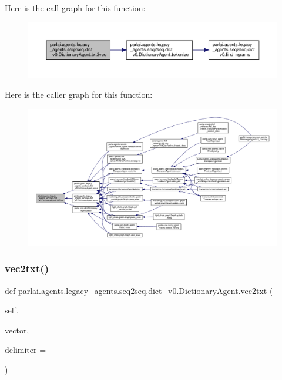 Here is the call graph for this function\+:
\nopagebreak
\begin{figure}[H]
\begin{center}
\leavevmode
\includegraphics[width=350pt]{classparlai_1_1agents_1_1legacy__agents_1_1seq2seq_1_1dict__v0_1_1DictionaryAgent_a5d89ed4dcebcd41853bd0614d30337e7_cgraph}
\end{center}
\end{figure}
Here is the caller graph for this function\+:
\nopagebreak
\begin{figure}[H]
\begin{center}
\leavevmode
\includegraphics[width=350pt]{classparlai_1_1agents_1_1legacy__agents_1_1seq2seq_1_1dict__v0_1_1DictionaryAgent_a5d89ed4dcebcd41853bd0614d30337e7_icgraph}
\end{center}
\end{figure}
\mbox{\label{classparlai_1_1agents_1_1legacy__agents_1_1seq2seq_1_1dict__v0_1_1DictionaryAgent_a87de974ecf69da7412e777220c29ba39}} 
\subsubsection{\texorpdfstring{vec2txt()}{vec2txt()}}
{\footnotesize\ttfamily def parlai.\+agents.\+legacy\+\_\+agents.\+seq2seq.\+dict\+\_\+v0.\+Dictionary\+Agent.\+vec2txt (\begin{DoxyParamCaption}\item[{}]{self,  }\item[{}]{vector,  }\item[{}]{delimiter = {\ttfamily \textquotesingle{}~\textquotesingle{}} }\end{DoxyParamCaption})}

